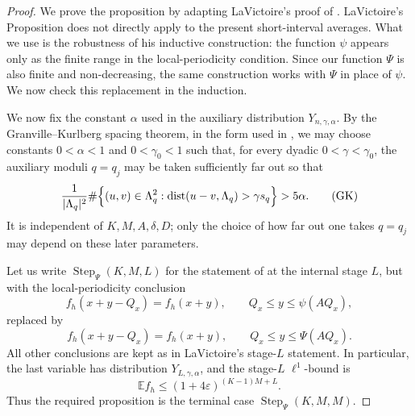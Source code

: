 \documentclass[12pt,leqno]{amsart}
\newcounter{counter}
\newcounter{counter2}
\numberwithin{equation}{section}
\numberwithin{counter2}{section}
\newcounter{theorem}
\theoremstyle{definition}
\theoremstyle{plain}
\begin{document}
\begin{proof}
	We prove the proposition by adapting LaVictoire's proof of
\cite[Proposition~4.1]{L9}. LaVictoire's Proposition does not directly apply to the
present short-interval averages. What we use is the robustness of his inductive
construction: the function \(\psi\) appears only as the finite range in the
local-periodicity condition. Since our function \(\Psi\) is also finite and
non-decreasing, the same construction works with \(\Psi\) in place of \(\psi\).
We now check this replacement in the induction.

We now fix the constant \(\alpha\) used in the auxiliary distribution
\(Y_{n,\gamma,\alpha}\). By the Granville--Kurlberg spacing theorem, in the
form used in \cite[(3.4)]{L9}, we may choose constants
\(0<\alpha<1\) and \(0<\gamma_0<1\) such that, for every dyadic
\(0<\gamma<\gamma_0\), the auxiliary moduli \(q=q_j\) may be taken sufficiently
far out so that
\[
\frac1{|\Lambda_q|^2}
\#\Bigl\{
(u,v)\in\Lambda_q^2:
\operatorname{dist}(u-v,\Lambda_q)>\gamma s_q
\Bigr\}
>
5\alpha .
\tag{GK}
\]
It is independent of
\(K,M,A,\delta,D\); only the choice of how far out one takes \(q=q_j\) may depend
on these later parameters.

Let us write \(\operatorname{Step}_{\Psi}(K,M,L)\) for the statement of
\cite[Proposition~4.1]{L9} at the internal stage \(L\), but with the
local-periodicity conclusion
\[
f_h(x+y-Q_x)=f_h(x+y),
\qquad
Q_x\leq y\leq \psi(AQ_x),
\]
replaced by
\[
f_h(x+y-Q_x)=f_h(x+y),
\qquad
Q_x\leq y\leq \Psi(AQ_x).
\]
All other conclusions are kept as in LaVictoire's stage-\(L\) statement. In
particular, the last variable has distribution \(Y_{L,\gamma,\alpha}\), and the
stage-\(L\) \(\ell^1\)-bound is
\[
\mathbb E f_h\leq (1+4\varepsilon)^{(K-1)M+L}.
\]
Thus the required proposition is the terminal case
\(\operatorname{Step}_{\Psi}(K,M,M)\).
	

\end{proof}
\end{document}
